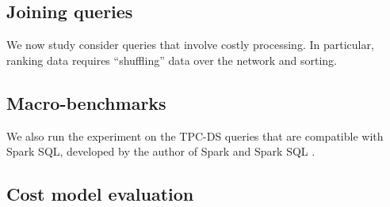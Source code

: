 \subsection{Joining queries}
We now study consider queries that involve costly processing. In particular, ranking data requires ``shuffling'' data over the network and sorting.

\subsection{Macro-benchmarks}
\label{sec:macro}
We also run the experiment on the TPC-DS queries that are compatible with Spark SQL, developed by the author of Spark and Spark SQL \cite{sparksqlperf}.

\subsection{Cost model evaluation}
\label{sec:cost}